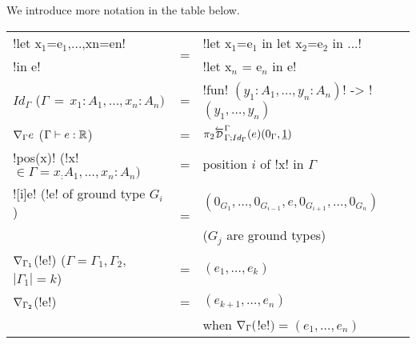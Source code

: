 \begin{notation}
We introduce more notation in the table below.\\

\begin{tabular}{|l c l|}
    \hline
    !let x$_{1}$=e$_{1}$,...,xn=en!  & \multirow{2}{*}{=} & !let x$_{1}$=e$_{1}$ in let x$_{2}$=e$_{2}$ in ...! \\
    !in e! && !let x$_n$ = e$_n$ in e!\\ \hline
    $Id_\Gamma$ \quad\quad\quad ($\Gamma \, = \, x_1:A_1,\ldots,x_n:A_n)$ & = & !fun! $(y_1:A_1,\ldots,y_n:A_n)$! -> !$(y_1,\ldots,y_n)$ \\ \hline
    $\nabla_\Gamma e$ \quad\quad\hspace{0.6em}($\Gamma\vdash e:\mathbb{R}$) & = & $\pi_2\directD{\Gamma}{\Gamma}{Id_\Gamma}(e)(0_\Gamma,\underline{1})$ \\ \hline
    !pos(x)! \quad(!x!$\in\Gamma=x_:A_1,\ldots,x_n:A_n)$ & = & position $i$ of !x! in $\Gamma$ \\ \hline
    ![i]e! \quad\quad(!e! of ground type $G_i$) & \multirow{2}{*}{=} &  $(0_{G_1},\ldots,0_{G_{i-1}},e,0_{G_{i+1}},\ldots,0_{G_n})$ \\
    && ($G_j$ are ground types) \\ \hline
    $\nabla_{\Gamma_1}$(!e!) \quad\quad($\Gamma=\Gamma_1,\Gamma_2$, $|\Gamma_1|=k$)& = & $(e_1,\ldots,e_k)$ \\
    $\nabla_{\Gamma_2}$(!e!) & = & $(e_{k+1},\ldots,e_n)$ \\
    && when $\nabla_{\Gamma}($!e!$) = (e_1,\ldots,e_n)$ \\ \hline
\end{tabular}
\end{notation}
